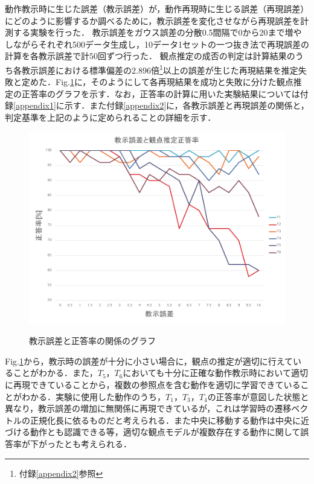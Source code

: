 動作教示時に生じた誤差（教示誤差）が，動作再現時に生じる誤差（再現誤差）にどのように影響するか調べるために，教示誤差を変化させながら再現誤差を計測する実験を行った．
教示誤差をガウス誤差の分散0.5間隔で0から20まで増やしながらそれぞれ500データ生成し，10データ1セットの一つ抜き法で再現誤差の計算を各教示誤差で計50回ずつ行った．
観点推定の成否の判定は計算結果のうち各教示誤差における標準偏差の2.896倍\footnote{付録\ref{appendix2}参照}以上の誤差が生じた再現結果を推定失敗と定めた．Fig.\ref{figure:success_rate}に，そのようにして各再現結果を成功と失敗に分けた観点推定の正答率のグラフを示す．なお，正答率の計算に用いた実験結果については付録\ref{appendix1}に示す．また付録\ref{appendix2}に，各教示誤差と再現誤差の関係と，判定基準を上記のように定められることの詳細を示す．
	\begin{figure}[h]
		\begin{center}
			\includegraphics[width=14cm]{chart2.png} \\ %
			\caption{教示誤差と正答率の関係のグラフ}
			\label{figure:success_rate}
		\end{center}
	\end{figure}

Fig.\ref{figure:success_rate}から，教示時の誤差が十分に小さい場合に，観点の推定が適切に行えていることがわかる．また，$T_{5}$，$T_{6}$においても十分に正確な動作教示時において適切に再現できていることから，複数の参照点を含む動作を適切に学習できていることがわかる．実験に使用した動作のうち，$T_{1}$，$T_{3}$，$T_{4}$の正答率が意図した状態と異なり，教示誤差の増加に無関係に再現できているが，これは学習時の遷移ベクトルの正規化長に依るものだと考えられる．また中央に移動する動作は中央に近づける動作とも認識できる等，適切な観点モデルが複数存在する動作に関して誤答率が下がったとも考えられる．

